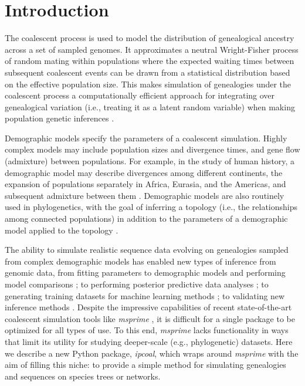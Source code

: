 \documentclass[11pt]{article}
\begin{document}
\section{Introduction}
The coalescent process \citep{hudson_testing_1983,kingman_coalescent_1982} is used to model the distribution of genealogical ancestry across a set of sampled genomes. It approximates a neutral Wright-Fisher process of random mating within populations where the expected waiting times between subsequent coalescent events can be drawn from a statistical distribution based on the effective population size. This makes simulation of genealogies under the coalescent process \citep{hudson_generating_2002} a computationally efficient approach for integrating over genealogical variation (i.e., treating it as a latent random variable) when making population genetic inferences \citep{beerli_coalescent_2001}. 

Demographic models specify the parameters of a coalescent simulation. Highly complex models may include population sizes and divergence times, and gene flow (admixture) between populations. For example, in the study of human history, a demographic model may describe divergences among different continents, the expansion of populations separately in Africa, Eurasia, and the Americas, and subsequent admixture between them \citep{reich_who_2018,gronau_demography_2011,green_neandertal_2010}. Demographic models are also routinely used in phylogenetics, with the goal of inferring a topology (i.e., the relationships among connected populations) in addition to the parameters of a demographic model applied to the topology \citep{knowles_estimating_2011,degnan_gene_2009}. 

The ability to simulate realistic sequence data evolving on genealogies sampled from complex demographic models has enabled new types of inference from genomic data, from fitting parameters to demographic models and performing model comparisons \citep{chung_bayesian_2017}; to performing posterior predictive data analyses \citep{brown_predictive_2014}; to generating training datasets for machine learning methods \citep{schrider_learning_2017}; to validating new inference methods \citep{adrion_community_maintained_2019}. Despite the impressive capabilities of recent state-of-the-art coalescent simulation tools like \emph{msprime} \citep{kelleher_efficient_2016}, it is difficult for a single package to be optimized for all types of use. To this end, \emph{msprime} lacks functionality in ways that limit its utility for studying deeper-scale (e.g., phylogenetic) datasets. Here we describe a new Python package, \emph{ipcoal}, which wraps around \emph{msprime} with the aim of filling this niche: to provide a simple method for simulating genealogies and sequences on species trees or networks.
\end{document}
